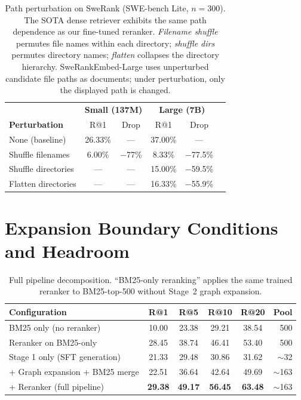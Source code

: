 \documentclass{article}
\begin{document}
\begin{table}[h]
\centering
\caption{Path perturbation on SweRank (SWE-bench Lite, $n{=}300$). The SOTA dense retriever exhibits the same path dependence as our fine-tuned reranker. \emph{Filename shuffle} permutes file names within each directory; \emph{shuffle dirs} permutes directory names; \emph{flatten} collapses the directory hierarchy. SweRankEmbed-Large uses unperturbed candidate file paths as documents; under perturbation, only the displayed path is changed.}
\label{tab:swerank_perturb}
\small
\begin{tabular}{lccccc}
\toprule
& \multicolumn{2}{c}{\textbf{Small (137M)}} & \multicolumn{2}{c}{\textbf{Large (7B)}} \\
\textbf{Perturbation} & R@1 & Drop & R@1 & Drop \\
\midrule
None (baseline) & 26.33\% & --- & 37.00\% & --- \\
Shuffle filenames & 6.00\% & $-$77\% & 8.33\% & $-$77.5\% \\
Shuffle directories & --- & --- & 15.00\% & $-$59.5\% \\
Flatten directories & --- & --- & 16.33\% & $-$55.9\% \\
\bottomrule
\end{tabular}
\end{table}


\section{Expansion Boundary Conditions and Headroom}
\label{app:expansion_details}

\begin{table}[h]
\centering
\caption{Full pipeline decomposition. ``BM25-only reranking'' applies the same trained reranker to BM25-top-500 without Stage~2 graph expansion.}
\label{tab:ablation}
\small
\begin{tabular}{lccccr}
\toprule
\textbf{Configuration} & \textbf{R@1} & \textbf{R@5} & \textbf{R@10} & \textbf{R@20} & \textbf{Pool} \\
\midrule
BM25 only (no reranker) & 10.00 & 23.38 & 29.21 & 38.54 & 500 \\
Reranker on BM25-only & 28.45 & 38.74 & 46.41 & 53.40 & 500 \\
\midrule
Stage 1 only (SFT generation) & 21.33 & 29.48 & 30.86 & 31.62 & $\sim$32 \\
\quad + Graph expansion + BM25 merge & 22.51 & 36.64 & 42.64 & 49.69 & $\sim$163 \\
\quad + Reranker (full pipeline) & \textbf{29.38} & \textbf{49.17} & \textbf{56.45} & \textbf{63.48} & $\sim$163 \\
\bottomrule
\end{tabular}
\end{table}
\end{document}
